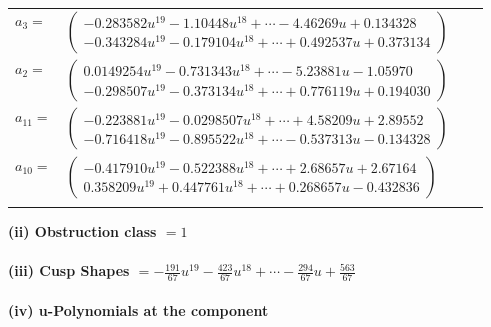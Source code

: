 \documentclass[1p]{elsarticle_modified}
\theoremstyle{definition}
\begin{document}
\begin{tabular}{m{7pt} m{180pt} m{7pt} m{180pt} }
\flushright $a_{3}=$&$\begin{pmatrix}-0.283582 u^{19}-1.10448 u^{18}+\cdots-4.46269 u+0.134328\\-0.343284 u^{19}-0.179104 u^{18}+\cdots+0.492537 u+0.373134\end{pmatrix}$ \\
\flushright $a_{2}=$&$\begin{pmatrix}0.0149254 u^{19}-0.731343 u^{18}+\cdots-5.23881 u-1.05970\\-0.298507 u^{19}-0.373134 u^{18}+\cdots+0.776119 u+0.194030\end{pmatrix}$ \\
\flushright $a_{11}=$&$\begin{pmatrix}-0.223881 u^{19}-0.0298507 u^{18}+\cdots+4.58209 u+2.89552\\-0.716418 u^{19}-0.895522 u^{18}+\cdots-0.537313 u-0.134328\end{pmatrix}$ \\
\flushright $a_{10}=$&$\begin{pmatrix}-0.417910 u^{19}-0.522388 u^{18}+\cdots+2.68657 u+2.67164\\0.358209 u^{19}+0.447761 u^{18}+\cdots+0.268657 u-0.432836\end{pmatrix}$\\&\end{tabular}
\flushleft \textbf{(ii) Obstruction class $= 1$}\\~\\
\flushleft \textbf{(iii) Cusp Shapes $= -\frac{191}{67} u^{19}-\frac{423}{67} u^{18}+\cdots-\frac{294}{67} u+\frac{563}{67}$}\\~\\
\newpage\renewcommand{\arraystretch}{1}
\flushleft \textbf{(iv) u-Polynomials at the component}\newline \\
\end{document}
